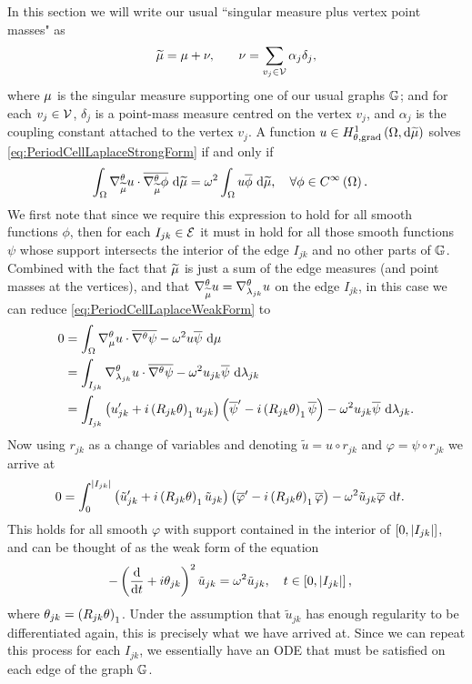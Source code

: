 In this section we will write our usual ``singular measure plus vertex point masses" as
\begin{align*}
	\widetilde{\mu} &= \mu + \nu, \quad
	& \nu = \sum_{v_j\in\mathcal{V}}\alpha_j \delta_j,
\end{align*}
where $\mu$ is the singular measure supporting one of our usual graphs $\mathbb{G}$; and for each $v_j\in\mathcal{V}$, $\delta_j$ is a point-mass measure centred on the vertex $v_j$, and $\alpha_j$ is the coupling constant attached to the vertex $v_j$.
A function $u\in H^1_{\theta, \mathrm{grad}}\left( \Omega, \mathrm{d}\widetilde{\mu} \right)$ solves \eqref{eq:PeriodCellLaplaceStrongForm} if and only if
\begin{align} \label{eq:PeriodCellLaplaceWeakForm}
	\int_{\Omega}\nabla^{\theta}_{\widetilde{\mu}}u\cdot\overline{\nabla^{\theta}_{\widetilde{\mu}}\phi} \ \mathrm{d}\widetilde{\mu} &= \omega^2\int_{\Omega}u\overline{\phi} \ \mathrm{d}\widetilde{\mu}, \quad\forall \phi\in C^{\infty}\left( \Omega \right).
\end{align}
We first note that since we require this expression to hold for all smooth functions $\phi$, then for each $I_{jk}\in \mathcal{E}$ it must in hold for all those smooth functions $\psi$ whose support intersects the interior of the edge $I_{jk}$ and no other parts of $\mathbb{G}$.
Combined with the fact that $\widetilde{\mu}$ is just a sum of the edge measures (and point masses at the vertices), and that $\nabla^{\theta}_{\widetilde{\mu}}u=\nabla^{\theta}_{\lambda_{jk}}u$ on the edge $I_{jk}$, in this case we can reduce \eqref{eq:PeriodCellLaplaceWeakForm} to
\begin{align*}
	0 &= \int_{\Omega}\nabla^{\theta}_\mu u \cdot \overline{\nabla^{\theta}\psi} - \omega^2 u\overline{\psi} \ \mathrm{d}\mu \\
	&= \int_{I_{jk}} \nabla^{\theta}_{\lambda_{jk}}u \cdot \overline{\nabla^{\theta}\psi} - \omega^2 u_{jk}\overline{\psi}  \ \mathrm{d}\lambda_{jk} \\
	&= \int_{I_{jk}} \left( u_{jk}' + i\left( R_{jk}\theta \right)_1 u_{jk} \right)\left( \overline{\psi}' - i\left( R_{jk}\theta \right)_1 \overline{\psi}  \right) - \omega^2 u_{jk}\overline{\psi}  \ \mathrm{d}\lambda_{jk}.
\end{align*}
Now using $r_{jk}$ as a change of variables and denoting $\tilde{u} = u \circ r_{jk}$ and $\varphi = \psi\circ r_{jk}$ we arrive at
\begin{align*}
	0 &= \int_{0}^{\left\lvert I_{jk} \right\rvert} \left( \tilde{u}_{jk}' + i\left( R_{jk}\theta \right)_1 \tilde{u}_{jk} \right)\left( \overline{\varphi}' - i\left( R_{jk}\theta \right)_1 \overline{\varphi}  \right) - \omega^2 \tilde{u}_{jk}\overline{\varphi} \ \mathrm{d} t .
\end{align*}
This holds for all smooth $\varphi$ with support contained in the interior of $\left[ 0,\left\lvert I_{jk} \right\rvert \right]$, and can be thought of as the weak form of the equation
\begin{align*}
	-\left( \dfrac{\mathrm{d}}{\mathrm{d}t} + i\theta_{jk} \right)^2 \tilde{u}_{jk} &= \omega^2 \tilde{u}_{jk}, \quad t\in\left[ 0,\left\lvert I_{jk} \right\rvert \right],
\end{align*}
where $\theta_{jk} = \left( R_{jk}\theta \right)_1$.
Under the assumption that $\tilde{u}_{jk}$ has enough regularity to be differentiated again, this is precisely what we have arrived at.
Since we can repeat this process for each $I_{jk}$, we essentially have an ODE that must be satisfied on each edge of the graph $\mathbb{G}$. \newline

